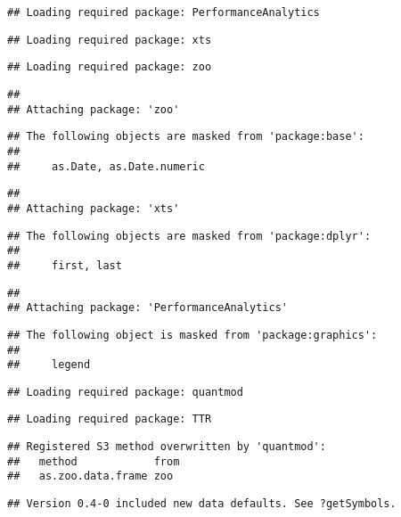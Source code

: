 \documentclass[
]{article}
\begin{document}
\begin{verbatim}
## Loading required package: PerformanceAnalytics
\end{verbatim}

\begin{verbatim}
## Loading required package: xts
\end{verbatim}

\begin{verbatim}
## Loading required package: zoo
\end{verbatim}

\begin{verbatim}
## 
## Attaching package: 'zoo'
\end{verbatim}

\begin{verbatim}
## The following objects are masked from 'package:base':
## 
##     as.Date, as.Date.numeric
\end{verbatim}

\begin{verbatim}
## 
## Attaching package: 'xts'
\end{verbatim}

\begin{verbatim}
## The following objects are masked from 'package:dplyr':
## 
##     first, last
\end{verbatim}

\begin{verbatim}
## 
## Attaching package: 'PerformanceAnalytics'
\end{verbatim}

\begin{verbatim}
## The following object is masked from 'package:graphics':
## 
##     legend
\end{verbatim}

\begin{verbatim}
## Loading required package: quantmod
\end{verbatim}

\begin{verbatim}
## Loading required package: TTR
\end{verbatim}

\begin{verbatim}
## Registered S3 method overwritten by 'quantmod':
##   method            from
##   as.zoo.data.frame zoo
\end{verbatim}

\begin{verbatim}
## Version 0.4-0 included new data defaults. See ?getSymbols.
\end{verbatim}
\end{document}
